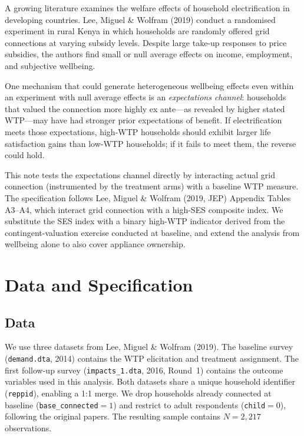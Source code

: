 \documentclass[12pt]{article}
\begin{document}
A growing literature examines the welfare effects of household
electrification in developing countries. Lee, Miguel \& Wolfram (2019)
conduct a randomised experiment in rural Kenya in which households are
randomly offered grid connections at varying subsidy levels. Despite large
take-up responses to price subsidies, the authors find small or null
average effects on income, employment, and subjective wellbeing.

One mechanism that could generate heterogeneous wellbeing effects even
within an experiment with null average effects is an \emph{expectations
channel}: households that valued the connection more highly ex ante---as
revealed by higher stated WTP---may have had stronger prior expectations
of benefit. If electrification meets those expectations, high-WTP
households should exhibit larger life satisfaction gains than low-WTP
households; if it fails to meet them, the reverse could hold.

This note tests the expectations channel directly by interacting actual
grid connection (instrumented by the treatment arms) with a baseline WTP
measure. The specification follows Lee, Miguel \& Wolfram (2019, JEP)
Appendix Tables A3--A4, which interact grid connection with a high-SES
composite index. We substitute the SES index with a binary high-WTP
indicator derived from the contingent-valuation exercise conducted at
baseline, and extend the analysis from wellbeing alone to also cover
appliance ownership.

\section{Data and Specification}
\label{sec:data}

\subsection*{Data}

We use three datasets from Lee, Miguel \& Wolfram (2019). The baseline
survey (\texttt{demand.dta}, 2014) contains the WTP elicitation and
treatment assignment. The first follow-up survey (\texttt{impacts\_1.dta},
2016, Round~1) contains the outcome variables used in this analysis. Both
datasets share a unique household identifier (\texttt{reppid}), enabling
a 1:1 merge. We drop households already connected at baseline
(\texttt{base\_connected}$=1$) and restrict to adult respondents
(\texttt{child}$=0$), following the original papers. The resulting sample
contains $N=2{,}217$ observations.
\end{document}
